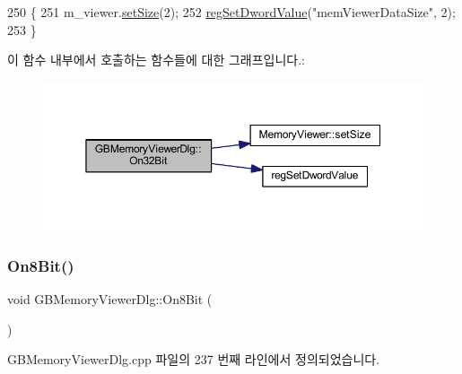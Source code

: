 \begin{DoxyCode}
250 \{
251   m\_viewer.\mbox{\hyperlink{class_memory_viewer_a185cb06e604ff1e0016b9be859c21387}{setSize}}(2);
252   \mbox{\hyperlink{_reg_8cpp_a758e775489a3fb5c3cc7071fdd5af87e}{regSetDwordValue}}(\textcolor{stringliteral}{"memViewerDataSize"}, 2);
253 \}
\end{DoxyCode}
이 함수 내부에서 호출하는 함수들에 대한 그래프입니다.\+:
\nopagebreak
\begin{figure}[H]
\begin{center}
\leavevmode
\includegraphics[width=350pt]{class_g_b_memory_viewer_dlg_a4e97f32250cfe77d1381fb21eed6daa4_cgraph}
\end{center}
\end{figure}
\mbox{\label{class_g_b_memory_viewer_dlg_a3e6f7abe8cf8dbc567d662eb33cf569b}} 
\subsubsection{\texorpdfstring{On8\+Bit()}{On8Bit()}}
{\footnotesize\ttfamily void G\+B\+Memory\+Viewer\+Dlg\+::\+On8\+Bit (\begin{DoxyParamCaption}{ }\end{DoxyParamCaption})\hspace{0.3cm}{\ttfamily [protected]}}



G\+B\+Memory\+Viewer\+Dlg.\+cpp 파일의 237 번째 라인에서 정의되었습니다.


